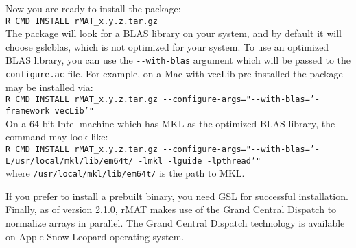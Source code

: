 \documentclass[11pt]{article}
\begin{document}
Now you are ready to install the package: \\[6pt]
\texttt{R CMD INSTALL rMAT\_x.y.z.tar.gz}\\[6pt]
The package will look for a BLAS library on your system, and by default it will choose gslcblas, which is not optimized for your system.  To use an optimized BLAS library, you can use the \texttt{-{}-with-blas} argument which will be passed to the \texttt{configure.ac} file.  For example, on a Mac with vecLib pre-installed the package may be installed via: \\[6pt]
\texttt{R CMD INSTALL rMAT\_x.y.z.tar.gz -{}-configure-args="-{}-with-blas='-framework vecLib'"}\\[6pt]
On a 64-bit Intel machine which has MKL as the optimized BLAS library, the command may look like: \\[6pt]
\texttt{R CMD INSTALL rMAT\_x.y.z.tar.gz -{}-configure-args="-{}-with-blas='-L/usr/local/mkl/lib/em64t/ -lmkl -lguide -lpthread'"}\\[6pt]
where \texttt{/usr/local/mkl/lib/em64t/} is the path to MKL. 

If you prefer to install a prebuilt binary, you need GSL for successful installation. Finally, as of version 2.1.0, rMAT makes use of the Grand Central Dispatch to normalize arrays in parallel. The Grand Central Dispatch technology is available on Apple Snow Leopard operating system.
\end{document}
